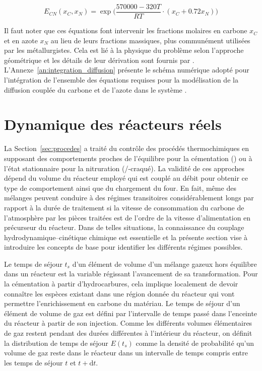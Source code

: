 \begin{equation}
E_{CN}(x_{C},x_{N})=
\exp\biggr(\frac{570000-320T}{RT}\cdot\left(x_{C}+0.72x_{N}\right)\biggr)
\end{equation}

Il faut noter que ces équations font intervenir les fractions molaires en carbone $x_{C}$ et en azote $x_{N}$ au lieu de leurs fractions massiques, plus communément utilisées par les métallurgistes. Cela est lié à la physique du problème selon l'approche géométrique et les détails de leur dérivation sont fournis par \citet{Slycke1981ii}. L'Annexe~\ref{an:integration_diffusion} présente le schéma numérique adopté pour l'intégration de l'ensemble des équations requises pour la modélisation de la diffusion couplée du carbone et de l'azote dans le système .

\section{Dynamique des réacteurs réels}
\label{sec:dynamique}

La Section~\ref{sec:procedes} a traité du contrôle des procédés thermochimiques en supposant des comportements proches de l'équilibre pour la cémentation () ou à l'état stationnaire pour la nitruration (/-craqué). La validité de ces approches dépend du volume du réacteur employé \textendash{} qui est couplé au débit pour obtenir ce type de comportement \textendash{} ainsi que du chargement du four. En fait, même des mélanges  peuvent conduire à des régimes transitoires considérablement longs par rapport à la durée de traitement si la vitesse de consommation du carbone de l'atmosphère par les pièces traitées est de l'ordre de la vitesse d'alimentation en précurseur du réacteur. Dans de telles situations, la connaissance du couplage hydrodynamique--cinétique chimique est essentielle et la présente section vise à introduire les concepts de base pour identifier les différents régimes possibles.

Le temps de séjour $t_s$ d'un élément de volume d'un mélange gazeux hors équilibre dans un réacteur est la variable régissant l'avancement de sa transformation. Pour la cémentation à partir d'hydrocarbures, cela implique localement de devoir connaître les espèces existant dans une région donnée du réacteur qui vont permettre l'enrichissement en carbone du matériau.  Le temps de séjour d'un élément de volume de gaz est défini par l'intervalle de temps passé dans l'enceinte du réacteur à partir de son injection. Comme les différents volumes élémentaires de gaz restent pendant des durées différentes à l'intérieur du réacteur, on définit la distribution de temps de séjour $E(t_{s})$ comme la densité de probabilité qu'un volume de gaz reste dans le réacteur dans un intervalle de temps compris entre les temps de séjour $t$ et $t+\mathrm{d}t$.

